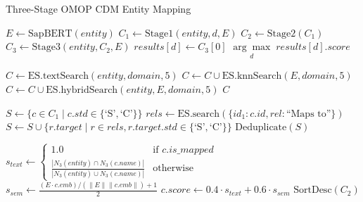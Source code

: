 \documentclass{article}
\begin{document}
\begin{algorithm}
\caption{Three-Stage OMOP CDM Entity Mapping}
\label{alg:omop_mapping}

\begin{algorithmic}[1]

    \State $E \gets \text{SapBERT}(entity)$
        \State $C_1 \gets \text{Stage1}(entity, d, E)$
        \State $C_2 \gets \text{Stage2}(C_1)$
        \State $C_3 \gets \text{Stage3}(entity, C_2, E)$
        \State $results[d] \gets C_3[0]$
    \EndFor
    \State \Return $\underset{d}{\arg\max} \; results[d].score$
\EndProcedure

\State

    \State $C \gets \text{ES.textSearch}(entity, domain, 5)$ 
    \State $C \gets C \cup \text{ES.knnSearch}(E, domain, 5)$ 
    \State $C \gets C \cup \text{ES.hybridSearch}(entity, E, domain, 5)$ 
    \State \Return $C$ 
\EndProcedure

\State

    \State $S \gets \{c \in C_1 \mid c.std \in \{\text{`S'}, \text{`C'}\}\}$
        \State $rels \gets \text{ES.search}(\{id_1: c.id, rel: \text{``Maps to''}\})$
        \State $S \gets S \cup \{r.target \mid r \in rels, r.target.std \in \{\text{`S'}, \text{`C'}\}\}$
    \EndFor
    \State \Return $\text{Deduplicate}(S)$
\EndProcedure

\State

        \State $s_{text} \gets \begin{cases} 1.0 & \text{if } c.is\_mapped \\ \frac{|N_3(entity) \cap N_3(c.name)|}{|N_3(entity) \cup N_3(c.name)|} & \text{otherwise} \end{cases}$
        \State $s_{sem} \gets \frac{(E \cdot c.emb) / (\|E\| \|c.emb\|) + 1}{2}$
        \State $c.score \gets 0.4 \cdot s_{text} + 0.6 \cdot s_{sem}$
    \EndFor
    \State \Return $\text{SortDesc}(C_2)$
\EndProcedure

\end{algorithmic}
\end{algorithm}
\end{document}
